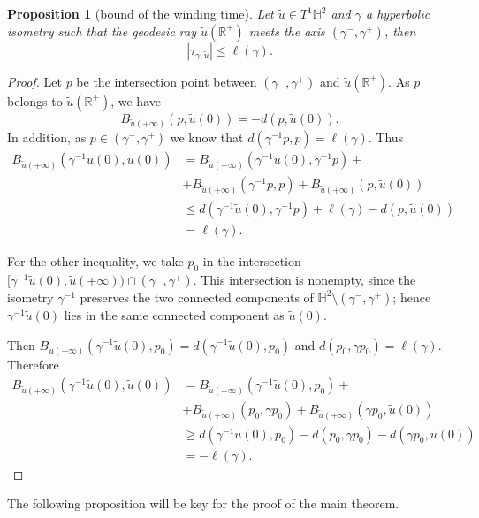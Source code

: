 \documentclass[a4paper,english,reqno]{amsart}
\newcommand{\R}{\mathbb{R}}
\renewcommand{\H}{\mathbb{H}}
\newtheorem{proposition}{Proposition}
\theoremstyle{definition}
\numberwithin{equation}{section}
\begin{document}
 \begin{proposition}[bound of the winding time]\label{bound_wind}
 	Let $\tilde{u}\in T^{1}\mathbb{H}^{2}$ and $\gamma$ a hyperbolic isometry such that the geodesic ray $\tilde u(\R^+)$ meets the axis $(\gamma^-,\gamma^+)$, 
 	then
 	\[
 	\left| \tau_{\gamma,\tilde u} \right| \leq \ell(\gamma).
 	\]
 	
 \end{proposition}
 \begin{proof}
 	Let $p$ be the intersection point between $(\gamma^-,\gamma^+)$ and $\tilde u(\R^+)$.
 	As $p$ belongs to $\tilde u(\R^+)$, we have
 	$$
 	B_{\tilde u(+\infty)}(p,\tilde u(0))=-d(p,\tilde u(0)).
 	$$
 	In addition, as $p\in (\gamma^-,\gamma^+)$ we know that $d(\gamma^{-1}p,p)=\ell(\gamma)$. Thus
 	\begin{align*}
 		B_{\tilde u(+\infty)}(\gamma^{-1}\tilde u(0),\tilde u(0)) 
 		& =  B_{\tilde u(+\infty)}(\gamma^{-1}\tilde u(0),\gamma^{-1}p)+  
 		\\
 		&+B_{\tilde u(+\infty)}(\gamma^{-1}p,p) +B_{\tilde u(+\infty)}(p,\tilde u(0)) \\
 		& \leq  d(\gamma^{-1}\tilde u(0),\gamma^{-1}p)+\ell(\gamma)-d(p,\tilde u(0))\\
 		& = \ell(\gamma).
 	\end{align*}
 	
 	For the other inequality, we take $p_0$ in the intersection $[\gamma^{-1}\tilde u(0),\tilde u(+\infty) )\cap (\gamma^-,\gamma^+)$. This intersection is nonempty, since the isometry $\gamma^{-1}$ preserves the two connected components of $\H^2\setminus(\gamma^-,\gamma^+)$; hence $\gamma^{-1}\tilde u(0)$ lies in the same connected component as $\tilde u(0)$.
 	
 	Then $B_{\tilde u(+\infty)}(\gamma^{-1}\tilde u(0),p_0)=d(\gamma^{-1}\tilde u(0),p_0)$ and $d(p_0,\gamma p_0)=\ell(\gamma)$. Therefore 	
 	\begin{align*}
 		B_{\tilde u(+\infty)}(\gamma^{-1}\tilde u(0),\tilde u(0)) &= B_{\tilde u(+\infty)}(\gamma^{-1}\tilde u(0),p_0)+\\
 		&+B_{\tilde u(+\infty)}(p_0,\gamma p_0)+B_{\tilde u(+\infty) }(\gamma p_0,\tilde u(0)) \\
 		& \geq d(\gamma^{-1}\tilde u(0),p_0)-d(p_0,\gamma p_0)-d(\gamma p_0,\tilde u(0))\\
 		&= - \ell (\gamma).
 	\end{align*}
 \end{proof}
 
 The following proposition will be key for the proof of the main theorem.
 
\end{document}
